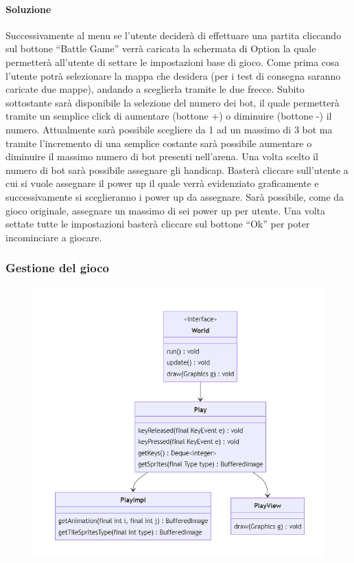 \documentclass[a4paper,12pt]{report}
\begin{document}
\paragraph{Soluzione} Successivamente al menu se l’utente deciderà di effettuare una partita cliccando sul bottone “Battle Game” verrà caricata la schermata di Option la quale permetterà all’utente di settare le impostazioni base di gioco. Come prima cosa l’utente potrà selezionare la mappa che desidera (per i test di consegna saranno caricate due mappe), andando a  sceglierla tramite le due frecce. Subito sottostante sarà disponibile la selezione del numero dei bot, il quale permetterà tramite un semplice click di aumentare (bottone +) o diminuire (bottone -) il numero. Attualmente sarà possibile scegliere da 1 ad un massimo di 3 bot ma tramite l’incremento di una semplice costante sarà possibile aumentare o diminuire il massimo numero di bot presenti nell’arena. Una volta scelto il numero di bot sarà possibile assegnare gli handicap. Basterà cliccare sull'utente a cui si vuole assegnare il power up il quale verrà evidenziato graficamente e successivamente si sceglieranno i power up da assegnare. Sarà possibile, come da gioco originale, assegnare un massimo di sei power up per utente.
Una volta settate tutte le impostazioni basterà cliccare sul bottone “Ok” per poter incominciare a giocare.

\subsubsection{Gestione del gioco}

\begin{figure}[H]
    \centering{}
    \includegraphics[width=\textwidth]{img/UMLGestioneGioco.png}
    \caption{}
\end{figure}
\end{document}
